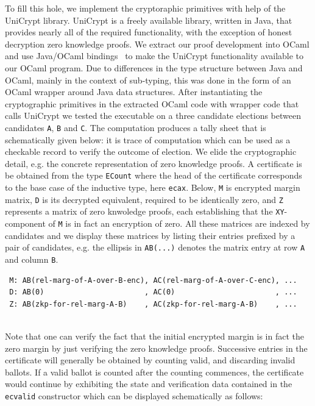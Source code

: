 \documentclass{llncs}
\begin{document}
To fill this hole, we implement the cryptoraphic primitives with
help of the UniCrypt library\cite{LocherH14}.
UniCrypt is a freely available library, written in Java,  that provides nearly all of
the required functionality, with the exception of honest decryption
zero knowledge proofs.  We extract our proof development into OCaml
and use Java/OCaml bindings~\cite{OCamlJava} to make the UniCrypt
functionality available to our OCaml program. Due to differences
in the type structure between Java and OCaml, mainly in the context
of sub-typing, this was done in the form of an OCaml wrapper around
Java data structures. 
 After instantiating the  
 cryptographic primitives in the extracted OCaml code with wrapper
 code that calls UniCrypt
 we tested the executable on a three candidate elections between
 candidates \texttt{A}, \texttt{B} and \texttt{C}.
 The computation produces a tally sheet that is schematically given
 below:
 it is trace of computation which can be used as a checkable record to verify
 the outcome of election. We elide the cryptographic detail, e.g.
 the concrete representation of zero knowledge proofs.
 A certificate
 is be obtained from the type \texttt{ECount} where the head
 of the certificate corresponds to the base case of the inductive
 type, here \texttt{ecax}. Below, \texttt{M} is encrypted margin
 matrix, \texttt{D} is its decrypted equivalent, required to be
 identically zero, and \texttt{Z} represents a matrix of zero
 knwoledge proofs, each establishing that the \texttt{XY}-component
 of \texttt{M} is in fact an encryption of zero. All these matrices
 are indexed by candidates and we display these matrices by listing
 their entries prefixed by a pair of candidates, e.g. the ellipsis
 in \texttt{AB(...)} denotes the matrix entry at row \texttt{A} and
 column \texttt{B}.

 {\small
 \begin{verbatim}
 M: AB(rel-marg-of-A-over-B-enc), AC(rel-marg-of-A-over-C-enc), ... 
 D: AB(0)                       , AC(0)                       , ...
 Z: AB(zkp-for-rel-marg-A-B)    , AC(zkp-for-rel-marg-A-B)    , ...
 \end{verbatim}}
 
 \mbox{}\\[-5ex]
 Note that one can verify the fact that the initial encrypted margin
 is in fact the zero margin by just verifying the zero knowledge
 proofs. Successive entries in the certificate will generally be
 obtained by counting valid, and discarding invalid ballots. If a
 valid ballot is counted after the counting commences, the
 certificate would continue by exhibiting the state and verification
 data contained in the \texttt{ecvalid} constructor which can be
 displayed schematically as follows:
\end{document}
